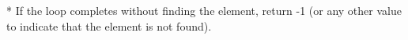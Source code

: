 \documentclass[preview]{standalone}
\begin{document}
* If the loop completes without finding the element, return -1 (or any other value to indicate that the element is not found).\\
\end{document}
